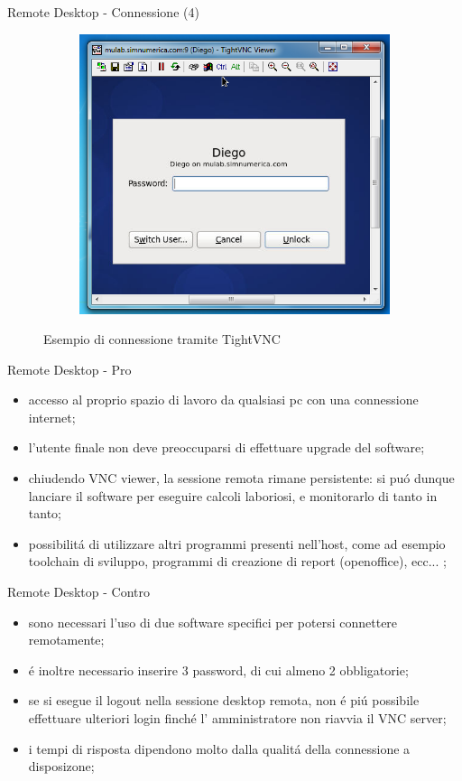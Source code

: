 \documentclass{beamer}
\begin{document}
\begin{frame}{Remote Desktop - Connessione (4)}
\begin{figure}
\begin{subfigure}{.5\textwidth}
  \includegraphics[scale=0.3]{images/tightvnc_rd.png}
\end{subfigure}
\caption{Esempio di connessione tramite TightVNC}
\end{figure}

\end{frame}

\begin{frame}{Remote Desktop - Pro}
\begin{itemize}
\item accesso al proprio spazio di lavoro da qualsiasi pc con una connessione internet;
\item l'utente finale non deve preoccuparsi di effettuare upgrade del software;
\item chiudendo VNC viewer, la sessione remota rimane persistente: si pu\'o dunque lanciare il software per eseguire calcoli
laboriosi, e monitorarlo di tanto in tanto;
\item possibilit\'a di utilizzare altri programmi presenti nell'host, come ad esempio toolchain di sviluppo, programmi di creazione di
report (openoffice), ecc... ;
\end{itemize}
\end{frame}

\begin{frame}{Remote Desktop - Contro}
\begin{itemize}
\item sono necessari l'uso di due software specifici per potersi connettere remotamente;
\item \'e inoltre necessario inserire 3 password, di cui almeno 2 obbligatorie;
\item se si esegue il logout nella sessione desktop remota, non \'e pi\'u possibile effettuare ulteriori login finch\'e l'
amministratore non riavvia il VNC server;
\item i tempi di risposta dipendono molto dalla qualit\'a della connessione a disposizone;
\end{itemize}
\end{frame}
\end{document}
